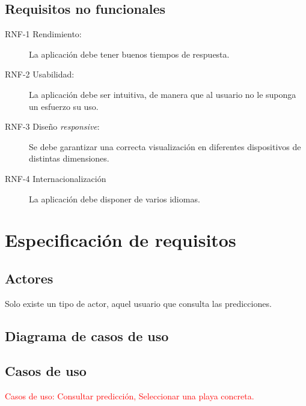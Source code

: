 	\subsection{Requisitos no funcionales}

\begin{description}
	\item[RNF-1 Rendimiento:] La aplicación debe tener buenos tiempos de respuesta.
	\item[RNF-2 Usabilidad:] La aplicación debe ser intuitiva, de manera que al usuario no le suponga un esfuerzo su uso.
	\item[RNF-3 Diseño \emph{responsive}:] Se debe garantizar una correcta visualización en diferentes dispositivos de distintas dimensiones.
	\item[RNF-4 Internacionalización] La aplicación debe disponer de varios idiomas.
\end{description}


\section{Especificación de requisitos}
	\subsection{Actores}
Solo existe un tipo de actor, aquel usuario que consulta las predicciones.
	\subsection{Diagrama de casos de uso}

	\subsection{Casos de uso}
	
	\textcolor{red}{Casos de uso: Consultar predicción, Seleccionar una playa concreta.}

